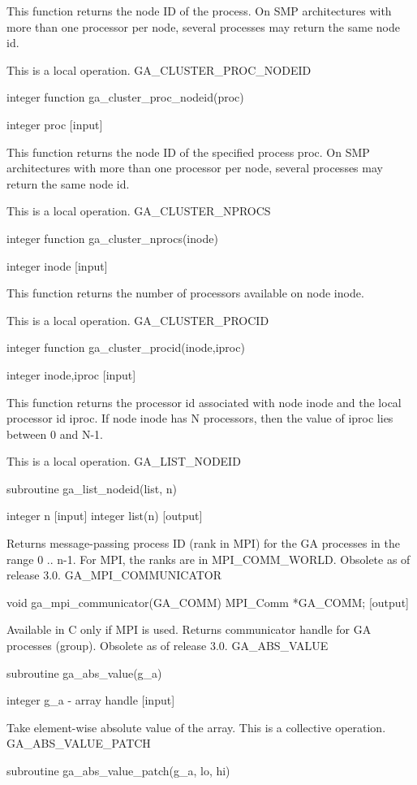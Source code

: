 This function returns the node ID of the process. On SMP architectures
with more than one processor per node, several processes may return
the same node id.

This is a local operation. GA\_CLUSTER\_PROC\_NODEID

integer function ga\_cluster\_proc\_nodeid(proc)

integer proc {[}input{]}

This function returns the node ID of the specified process proc. On
SMP architectures with more than one processor per node, several processes
may return the same node id.

This is a local operation. GA\_CLUSTER\_NPROCS

integer function ga\_cluster\_nprocs(inode)

integer inode {[}input{]}

This function returns the number of processors available on node inode.

This is a local operation. GA\_CLUSTER\_PROCID

integer function ga\_cluster\_procid(inode,iproc)

integer inode,iproc {[}input{]}

This function returns the processor id associated with node inode
and the local processor id iproc. If node inode has N processors,
then the value of iproc lies between 0 and N-1.

This is a local operation. GA\_LIST\_NODEID

subroutine ga\_list\_nodeid(list, n)

integer n {[}input{]} integer list(n) {[}output{]}

Returns message-passing process ID (rank in MPI) for the GA processes
in the range 0 .. n-1. For MPI, the ranks are in MPI\_COMM\_WORLD.
Obsolete as of release 3.0. GA\_MPI\_COMMUNICATOR

void ga\_mpi\_communicator(GA\_COMM) MPI\_Comm {*}GA\_COMM; {[}output{]}

Available in C only if MPI is used. Returns communicator handle for
GA processes (group). Obsolete as of release 3.0. GA\_ABS\_VALUE

subroutine ga\_abs\_value(g\_a)

integer g\_a - array handle {[}input{]}

Take element-wise absolute value of the array. This is a collective
operation. GA\_ABS\_VALUE\_PATCH

subroutine ga\_abs\_value\_patch(g\_a, lo, hi)

